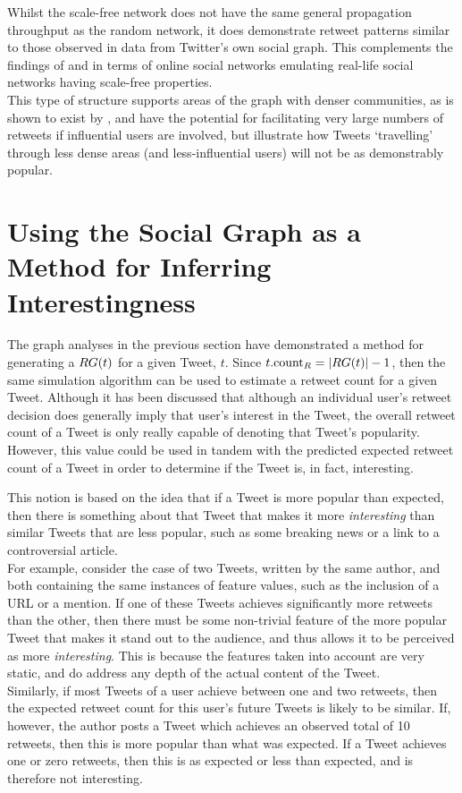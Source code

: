 Whilst the scale-free network does not have the same general propagation throughput as the random network, it does demonstrate retweet patterns similar to those observed in data from Twitter's own social graph. This complements the findings of \cite{mislove07} and \cite{hein06} in terms of online social networks emulating real-life social networks having scale-free properties.\\
This type of structure supports areas of the graph with denser communities, as is shown to exist by \cite{java07}, and have the potential for facilitating very large numbers of retweets if influential users are involved, but illustrate how Tweets `travelling' through less dense areas (and less-influential users) will not be as demonstrably popular.



\section{Using the Social Graph as a Method for Inferring Interestingness}
The graph analyses in the previous section have demonstrated a method for generating a $RG(t)$ for a given Tweet, $t$. Since $t.\textrm{count}_R = |RG(t)| - 1$, then the same simulation algorithm can be used to estimate a retweet count for a given Tweet. Although it has been discussed that although an individual user's retweet decision does generally imply that user's interest in the Tweet, the overall retweet count of a Tweet is only really capable of denoting that Tweet's popularity. However, this value could be used in tandem with the predicted expected retweet count of a Tweet in order to determine if the Tweet is, in fact, interesting.

This notion is based on the idea that if a Tweet is more popular than expected, then there is something about that Tweet that makes it more \textit{interesting} than similar Tweets that are less popular, such as some breaking news or a link to a controversial article.\\
For example, consider the case of two Tweets, written by the same author, and both containing the same instances of feature values, such as the inclusion of a URL or a mention. If one of these Tweets achieves significantly more retweets than the other, then there must be some non-trivial feature of the more popular Tweet that makes it stand out to the audience, and thus allows it to be perceived as more \textit{interesting}. This is because the features taken into account are very static, and do address any depth of the actual content of the Tweet.\\
Similarly, if most Tweets of a user achieve between one and two retweets, then the expected retweet count for this user's future Tweets is likely to be similar. If, however, the author posts a Tweet which achieves an observed total of 10 retweets, then this is more popular than what was expected. If a Tweet achieves one or zero retweets, then this is as expected or less than expected, and is therefore not interesting.

